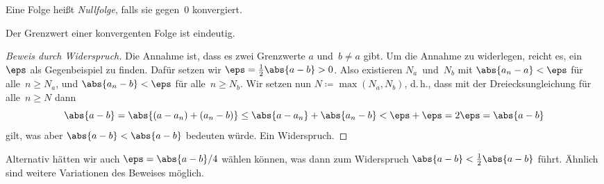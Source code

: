 \documentclass[a4paper]{article}
\begin{document}
\begin{definition}[Nullfolge]
    Eine Folge heißt \emph{Nullfolge}, falls sie gegen~$0$ konvergiert.
\end{definition}

\begin{theorem}
    Der Grenzwert einer konvergenten Folge ist eindeutig.
\end{theorem}

\begin{proof}[Beweis durch Widerspruch]
    Die Annahme ist, dass es zwei Grenzwerte $a$ und~$b \neq a$ gibt. Um die Annahme zu widerlegen, reicht es, ein~$\eps$ als Gegenbeispiel zu finden. Dafür setzen wir $\eps = \frac{1}{2}\abs{a-b} > 0$. Also existieren $N_a$~und~$N_b$ mit $\abs{a_n - a} < \eps$ für alle~$n \geq N_a$, und $\abs{a_n - b} < \eps$ für alle~$n \geq N_b$. Wir setzen nun $N \coloneqq \max(N_a, N_b)$, d.\,h., dass mit der Dreiecksungleichung für alle~$n \geq N$ dann
    \begin{equation*}
        \abs{a-b} = \abs{(a-a_n) + (a_n-b)} \leq \abs{a-a_n} + \abs{a_n-b} < \eps + \eps = 2 \eps = \abs{a-b}
    \end{equation*}
    gilt, was aber $\abs{a-b} < \abs{a-b}$ bedeuten würde. Ein Widerspruch.
\end{proof}

Alternativ hätten wir auch $\eps = \abs{a-b}/4$ wählen können, was dann zum Widerspruch $\abs{a-b} < \frac{1}{2}\abs{a-b}$ führt. Ähnlich sind weitere Variationen des Beweises möglich.
\end{document}
